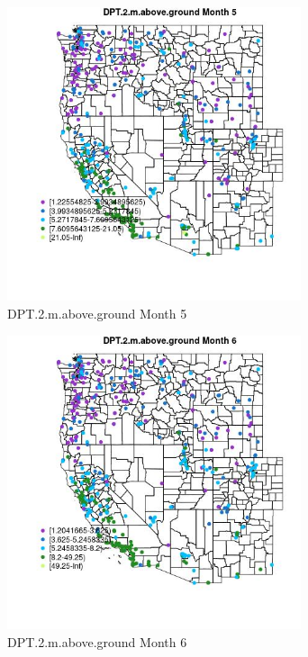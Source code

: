 \begin{figure} 
\centering  
\includegraphics[width=0.77\textwidth]{Code_Outputs/ML_input_report_ML_input_PM25_Step5_part_d_de_duplicated_aves_ML_input_MapObsMo5DPT2maboveground.jpg} 
\caption{\label{fig:ML_input_report_ML_input_PM25_Step5_part_d_de_duplicated_aves_ML_inputMapObsMo5DPT2maboveground}DPT.2.m.above.ground Month 5} 
\end{figure} 
 

\begin{figure} 
\centering  
\includegraphics[width=0.77\textwidth]{Code_Outputs/ML_input_report_ML_input_PM25_Step5_part_d_de_duplicated_aves_ML_input_MapObsMo6DPT2maboveground.jpg} 
\caption{\label{fig:ML_input_report_ML_input_PM25_Step5_part_d_de_duplicated_aves_ML_inputMapObsMo6DPT2maboveground}DPT.2.m.above.ground Month 6} 
\end{figure} 
 

